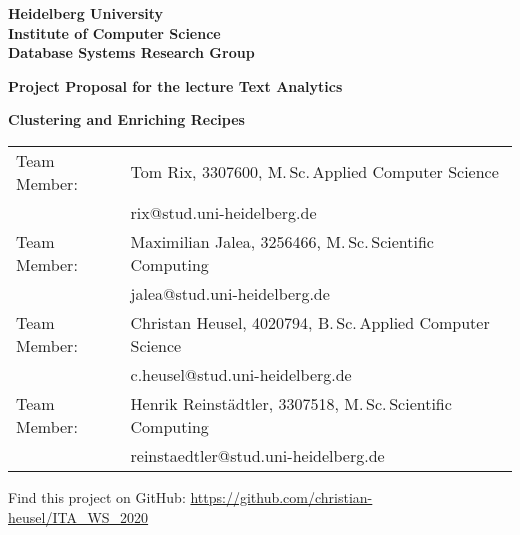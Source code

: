 \documentclass[
     12pt,         %
     a4paper,      %
     BCOR10mm,     %
     DIV14,        %
     ]{article}
\begin{document}
\begin{titlepage}


\vspace*{1cm}
\begin{center}
\vspace*{3cm}
\textbf{
\Large Heidelberg University\\
\smallskip
\Large Institute of Computer Science\\
\smallskip
\Large Database Systems Research Group\\
\smallskip
}

\vspace{3cm}

\textbf{\large Project Proposal for the lecture Text Analytics}

\vspace{0.5\baselineskip}
{\huge
\textbf{Clustering and Enriching Recipes}
}
\end{center}

\vfill

{
\begin{tabular}[l]{ll}
    Team Member: & Tom Rix, 3307600, M.\,Sc.\,Applied Computer Science \\
                 & rix@stud.uni-heidelberg.de \\
    Team Member: & Maximilian Jalea, 3256466, M.\,Sc.\,Scientific Computing \\
                 & jalea@stud.uni-heidelberg.de\\
    Team Member: & Christan Heusel, 4020794, B.\,Sc.\,Applied Computer Science \\
                 & c.heusel@stud.uni-heidelberg.de \\
    Team Member: & Henrik Reinstädtler, 3307518, M.\,Sc.\,Scientific Computing \\
                 & reinstaedtler@stud.uni-heidelberg.de \\


\end{tabular}
}

\vspace{1cm}
\large \centering {} Find this project on GitHub: \url{https://github.com/christian-heusel/ITA_WS_2020}

\end{titlepage}
\end{document}
